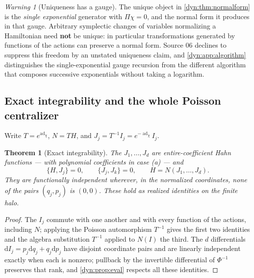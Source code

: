 \documentclass[11pt,letterpaper]{article}
\newtheorem{theorem}{Theorem}[section]
\theoremstyle{definition}
\theoremstyle{remark}
\newtheorem{warning}[warning]{Warning}
\newcommand{\ad}{\operatorname{ad}}
\numberwithin{equation}{section}
\begin{document}
\begin{warning}[Uniqueness has a gauge]
\label{dyn:warn:gauge}
The unique object in \cref{dyn:thm:normalform} is the \emph{single
exponential} generator with $\Pi\chi=0$, and the normal form it produces in
that gauge. Arbitrary symplectic changes of variables normalizing a
Hamiltonian need \textbf{not} be unique: in particular transformations
generated by functions of the actions can preserve a normal form. Source 06
declines to suppress this freedom by an unstated uniqueness claim, and
\cref{dyn:app:algorithm} distinguishes the single-exponential gauge
recursion from the different algorithm that composes successive
exponentials without taking a logarithm.
\end{warning}

\subsection{Exact integrability and the whole Poisson centralizer}
Write $T=e^{\ad_\chi}$, $N=TH$, and $J_j=T^{-1}I_j=e^{-\ad_\chi}I_j$.

\begin{theorem}[Exact integrability]\label{dyn:thm:integrability}
The $J_1,\dots,J_d$ are entire-coefficient Hahn functions --- with
polynomial coefficients in case (a) --- and
\begin{equation}\label{dyn:eq:integrals}
 \{H,J_j\}=0,\qquad \{J_j,J_k\}=0,\qquad H=N(J_1,\dots,J_d).
\end{equation}
They are functionally independent wherever, in the normalized coordinates,
none of the pairs $(q_j,p_j)$ is $(0,0)$. These hold as realized identities
on the finite halo.
\end{theorem}
\begin{proof}
The $I_j$ commute with one another and with every function of the actions,
including $N$; applying the Poisson automorphism $T^{-1}$ gives the first
two identities and the algebra substitution $T^{-1}$ applied to $N(I)$ the
third. The $d$ differentials $\mathrm dI_j=p_j\mathrm dq_j+q_j\mathrm dp_j$
have disjoint coordinate pairs and are linearly independent exactly when
each is nonzero; pullback by the invertible differential of $\Phi^{-1}$
preserves that rank, and \cref{dyn:prop:eval} respects all these
identities.
\end{proof}
\end{document}
